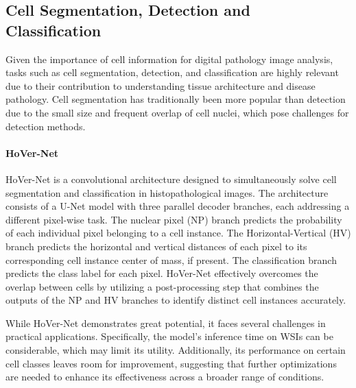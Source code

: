 \subsection{Cell Segmentation, Detection and Classification}
\label{sec:related:cell}

Given the importance of cell information for digital pathology image analysis, tasks such as cell segmentation, detection, and classification are highly relevant due to their contribution to understanding tissue architecture and disease pathology. Cell segmentation \cite{graham2019hover,baumann2024hover,anglada2024enhancing} has traditionally been more popular than detection due to the small size and frequent overlap of cell nuclei, which pose challenges for detection methods.

\paragraph{HoVer-Net \cite{graham2019hover}} HoVer-Net is a convolutional architecture designed to simultaneously solve cell segmentation and classification in histopathological images. The architecture consists of a U-Net \cite{ronneberger2015u} model with three parallel decoder branches, each addressing a different pixel-wise task. The nuclear pixel (NP) branch predicts the probability of each individual pixel belonging to a cell instance. The Horizontal-Vertical (HV) branch predicts the horizontal and vertical distances of each pixel to its corresponding cell instance center of mass, if present. The classification branch predicts the class label for each pixel. HoVer-Net effectively overcomes the overlap between cells by utilizing a post-processing step that combines the outputs of the NP and HV branches to identify distinct cell instances accurately.

While HoVer-Net demonstrates great potential, it faces several challenges in practical applications. Specifically, the model's inference time on WSIs can be considerable, which may limit its utility. Additionally, its performance on certain cell classes leaves room for improvement, suggesting that further optimizations are needed to enhance its effectiveness across a broader range of conditions.

